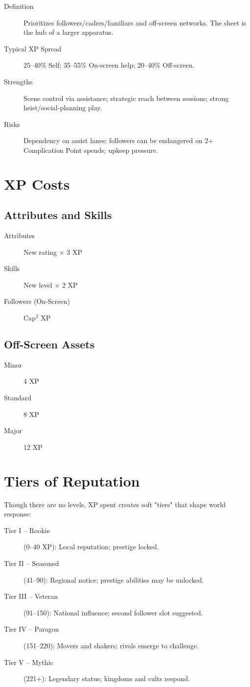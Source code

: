 \begin{description}
\item[Definition] Prioritizes followers/cadres/familiars and off-screen networks. The sheet is the hub of a larger apparatus.
\item[Typical XP Spread] 25--40\% Self; 35--55\% On-screen help; 20--40\% Off-screen.
\item[Strengths] Scene control via assistance; strategic reach between sessions; strong heist/social-planning play.
\item[Risks] Dependency on assist lanes; followers can be endangered on 2+ Complication Point spends; upkeep pressure.
\end{description}

\section{XP Costs}

\subsection{Attributes and Skills}

\begin{description}
\item[Attributes] New rating $\times$ 3 XP
\item[Skills] New level $\times$ 2 XP
\item[Followers (On-Screen)] Cap$^2$ XP
\end{description}

\subsection{Off-Screen Assets}

\begin{description}
\item[Minor] 4 XP
\item[Standard] 8 XP
\item[Major] 12 XP
\end{description}

\section{Tiers of Reputation}

Though there are no levels, XP spent creates soft "tiers" that shape world response:

\begin{description}
\item[Tier I -- Rookie] (0--40 XP): Local reputation; prestige locked.
\item[Tier II -- Seasoned] (41--90): Regional notice; prestige abilities may be unlocked.
\item[Tier III -- Veteran] (91--150): National influence; second follower slot suggested.
\item[Tier IV -- Paragon] (151--220): Movers and shakers; rivals emerge to challenge.
\item[Tier V -- Mythic] (221+): Legendary status; kingdoms and cults respond.
\end{description}

